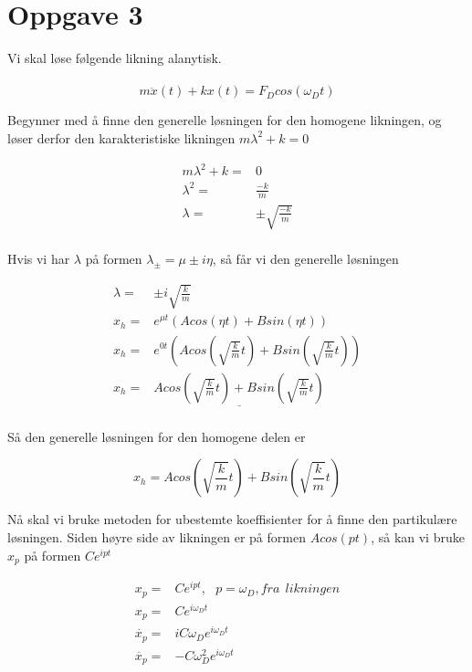 \documentclass[norsk,a4paper,12pt]{article}
\begin{document}
\section*{Oppgave 3}

Vi skal løse følgende likning alanytisk.
\\
\\
\begin{equation}
	m \ddot{x}(t) +kx(t) = F_D cos(\omega_Dt)
	\label{eq:diffpatrykt}
\end{equation}

Begynner med å finne den generelle løsningen for den homogene likningen, og løser derfor den karakteristiske likningen $m\lambda^2 + k = 0$

\begin{align*}
	m\lambda^2 + k =& 0 \\
	\lambda^2 =& \frac{-k}{m} \\
	\lambda =& \pm \sqrt{\frac{-k}{m}}\\
\end{align*}

Hvis vi har $\lambda$ på formen $\lambda_{\pm} = \mu \pm i\eta$, så får vi den generelle løsningen

\begin{align*}
	\lambda =& \pm i \sqrt{\frac{k}{m}}\\
	x_h =& e^{\mu t}(A cos(\eta t) + B sin(\eta t))\\
	x_h =& e^{0t} \left(A cos \left(\sqrt{\frac{k}{m}}t\right) +B sin \left(\sqrt{\frac{k}{m}}t \right) \right)\\
	x_h =& \underline{A cos \left(\sqrt{\frac{k}{m}}t \right) +B sin \left(\sqrt{\frac{k}{m}}t \right)}\\
\end{align*}

Så den generelle løsningen for den homogene delen er

\begin{equation}
	x_h = A cos \left(\sqrt{\frac{k}{m}}t \right) +B sin \left(\sqrt{\frac{k}{m}}t \right)
\end{equation}


Nå skal vi bruke metoden for ubestemte koeffisienter for å finne den partikulære løsningen. Siden høyre side av likningen er på formen $A cos(pt)$, så kan vi bruke $x_p$ på formen $C e^{ipt}$

\begin{align*}
	x_p =& C e^{ipt},\   \   \ p=\omega_D, fra\ \ likningen\\
	x_p =& C e^{i\omega_Dt}\\
	\dot{x_p} =& iC\omega_D e^{i\omega_Dt}\\
	\ddot{x_p} =& -C\omega_D^2 e^{i\omega_Dt}\\
\end{align*}
\end{document}
